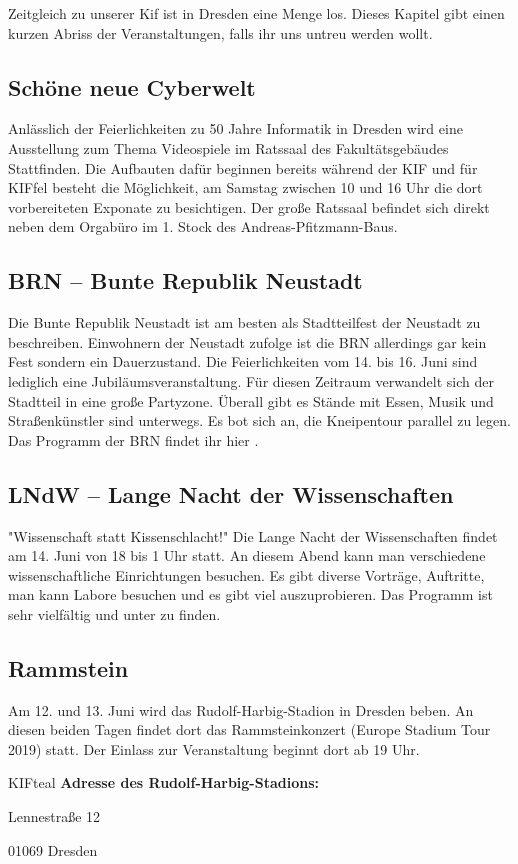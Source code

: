Zeitgleich zu unserer Kif ist in Dresden eine Menge los. Dieses Kapitel gibt einen kurzen Abriss der Veranstaltungen, falls ihr uns untreu werden wollt.

\subsection*{Schöne neue Cyberwelt}
Anlässlich der Feierlichkeiten zu 50 Jahre Informatik in Dresden wird eine Ausstellung zum Thema Videospiele im Ratssaal des Fakultätsgebäudes Stattfinden.
Die Aufbauten dafür beginnen bereits während der KIF und für KIFfel besteht die Möglichkeit, am Samstag zwischen 10 und 16 Uhr die dort vorbereiteten Exponate zu besichtigen.
Der große Ratssaal befindet sich direkt neben dem Orgabüro im 1. Stock des Andreas-Pfitzmann-Baus.


\subsection*{BRN -- Bunte Republik Neustadt}
Die Bunte Republik Neustadt ist am besten als Stadtteilfest der Neustadt zu beschreiben.
Einwohnern der Neustadt zufolge ist die BRN allerdings gar kein Fest sondern ein Dauerzustand.
Die Feierlichkeiten vom 14. bis 16. Juni sind lediglich eine Jubiläumsveranstaltung.
Für diesen Zeitraum verwandelt sich der Stadtteil in eine große Partyzone.
Überall gibt es Stände mit Essen, Musik und Straßenkünstler sind unterwegs.
Es bot sich an, die Kneipentour parallel zu legen.
Das Programm der BRN findet ihr hier .

\subsection*{LNdW -- Lange Nacht der Wissenschaften}
"Wissenschaft statt Kissenschlacht!"
Die Lange Nacht der Wissenschaften findet am 14. Juni von 18 bis 1 Uhr statt.
An diesem Abend kann man verschiedene wissenschaftliche Einrichtungen besuchen.
Es gibt diverse Vorträge, Auftritte, man kann Labore besuchen und es gibt viel auszuprobieren.
Das Programm ist sehr vielfältig und unter  zu finden.

\subsection*{Rammstein}
Am 12. und 13. Juni wird das Rudolf-Harbig-Stadion in Dresden beben.
An diesen beiden Tagen findet dort das Rammsteinkonzert (Europe Stadium Tour 2019) statt.
Der Einlass zur Veranstaltung beginnt dort ab 19 Uhr.

\begin{awesomeblock}[KIFteal]{2pt}{\faQuestion}{KIFteal}
    \textbf{Adresse des Rudolf-Harbig-Stadions:}

    Lennestraße 12

    01069 Dresden
\end{awesomeblock}
